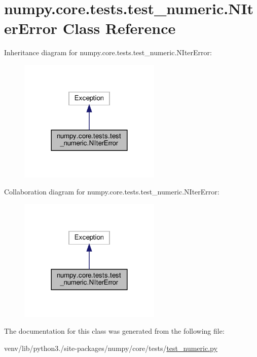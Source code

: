 \hypertarget{classnumpy_1_1core_1_1tests_1_1test__numeric_1_1NIterError}{}\section{numpy.\+core.\+tests.\+test\+\_\+numeric.\+N\+Iter\+Error Class Reference}
\label{classnumpy_1_1core_1_1tests_1_1test__numeric_1_1NIterError}


Inheritance diagram for numpy.\+core.\+tests.\+test\+\_\+numeric.\+N\+Iter\+Error\+:
\nopagebreak
\begin{figure}[H]
\begin{center}
\leavevmode
\includegraphics[width=192pt]{classnumpy_1_1core_1_1tests_1_1test__numeric_1_1NIterError__inherit__graph}
\end{center}
\end{figure}


Collaboration diagram for numpy.\+core.\+tests.\+test\+\_\+numeric.\+N\+Iter\+Error\+:
\nopagebreak
\begin{figure}[H]
\begin{center}
\leavevmode
\includegraphics[width=192pt]{classnumpy_1_1core_1_1tests_1_1test__numeric_1_1NIterError__coll__graph}
\end{center}
\end{figure}


The documentation for this class was generated from the following file\+:\begin{DoxyCompactItemize}
\item 
venv/lib/python3./site-\/packages/numpy/core/tests/\hyperlink{core_2tests_2test__numeric_8py}{test\+\_\+numeric.\+py}\end{DoxyCompactItemize}
